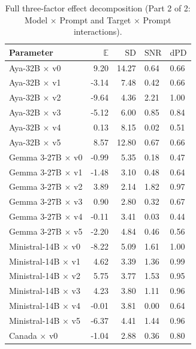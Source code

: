 \begin{table}[htbp]
  \caption{Full three-factor effect decomposition (Part 2 of 2: Model $\times$ Prompt and Target $\times$ Prompt interactions).}
  \label{tab:prompt-effects-p2}
  \centering
  \begin{small}
  \begin{sc}
  \begin{tabular}{lrrll}
  \toprule
  Parameter & $\mathbb{E}$ & $\mathrm{SD}$ & $\mathrm{SNR}$ & $\mathrm{dPD}$ \\
  \midrule
  Aya-32B $\times$ v0        &  9.20 & 14.27 & 0.64 & 0.66 \\
  Aya-32B $\times$ v1        & -3.14 &  7.48 & 0.42 & 0.66 \\
  Aya-32B $\times$ v2        & -9.64 &  4.36 & 2.21 & 1.00 \\
  Aya-32B $\times$ v3        & -5.12 &  6.00 & 0.85 & 0.84 \\
  Aya-32B $\times$ v4        &  0.13 &  8.15 & 0.02 & 0.51 \\
  Aya-32B $\times$ v5        &  8.57 & 12.80 & 0.67 & 0.66 \\
  \midrule
  Gemma 3-27B $\times$ v0    & -0.99 &  5.35 & 0.18 & 0.47 \\
  Gemma 3-27B $\times$ v1    & -1.48 &  3.10 & 0.48 & 0.64 \\
  Gemma 3-27B $\times$ v2    &  3.89 &  2.14 & 1.82 & 0.97 \\
  Gemma 3-27B $\times$ v3    &  0.90 &  2.80 & 0.32 & 0.67 \\
  Gemma 3-27B $\times$ v4    & -0.11 &  3.41 & 0.03 & 0.44 \\
  Gemma 3-27B $\times$ v5    & -2.20 &  4.84 & 0.46 & 0.56 \\
  \midrule
  Ministral-14B $\times$ v0  & -8.22 &  5.09 & 1.61 & 1.00 \\
  Ministral-14B $\times$ v1  &  4.62 &  3.39 & 1.36 & 0.99 \\
  Ministral-14B $\times$ v2  &  5.75 &  3.77 & 1.53 & 0.95 \\
  Ministral-14B $\times$ v3  &  4.23 &  3.80 & 1.11 & 0.96 \\
  Ministral-14B $\times$ v4  & -0.01 &  3.81 & 0.00 & 0.64 \\
  Ministral-14B $\times$ v5  & -6.37 &  4.41 & 1.44 & 0.96 \\
  \midrule
  Canada $\times$ v0 & -1.04 & 2.88 & 0.36 & 0.80 \\

\end{tabular}
\end{sc}
\end{small}
\end{table}
